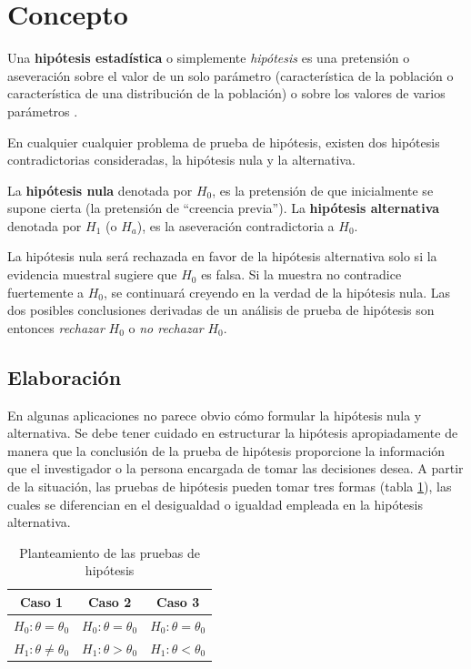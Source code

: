 \documentclass[
  11pt,
]{book}
\theoremstyle{definition}
\theoremstyle{definition}
\theoremstyle{definition}
\theoremstyle{definition}
\theoremstyle{remark}
\begin{document}
\section{Concepto}\label{concepto-1}

Una \textbf{hipótesis estadística} o simplemente \emph{hipótesis} es una pretensión o aseveración sobre el valor de un solo parámetro (característica de la población o característica de una distribución de la población) o sobre los valores de varios parámetros \citep[página 285]{Devore} \citep[página 340]{anderson}.

En cualquier cualquier problema de prueba de hipótesis, existen dos hipótesis contradictorias consideradas, la hipótesis nula y la alternativa.

La \textbf{hipótesis nula} denotada por \(H_0\), es la pretensión de que inicialmente se supone cierta (la pretensión de ``creencia previa''). La \textbf{hipótesis alternativa} denotada por \(H_1\) (o \(H_a\)), es la aseveración contradictoria a \(H_0\).

La hipótesis nula será rechazada en favor de la hipótesis alternativa solo si la evidencia muestral sugiere que \(H_0\) es falsa. Si la muestra no contradice fuertemente a \(H_0\), se continuará creyendo en la verdad de la hipótesis nula. Las dos posibles conclusiones derivadas de un análisis de prueba de hipótesis son entonces \emph{rechazar} \(H_0\) o \emph{no rechazar} \(H_0\).

\subsection{Elaboración}\label{elaboraciuxf3n-1}

En algunas aplicaciones no parece obvio cómo formular la hipótesis nula y alternativa. Se debe tener cuidado en estructurar la hipótesis apropiadamente de manera que la conclusión de la prueba de hipótesis proporcione la información que el investigador o la persona encargada de tomar las decisiones desea. A partir de la situación, las pruebas de hipótesis pueden tomar tres formas (tabla \ref{tab:hipotesis}), las cuales se diferencian en el desigualdad o igualdad empleada en la hipótesis alternativa.

\begin{table}[H]
\centering
\caption{\label{tab:hipotesis}Planteamiento de las pruebas de hipótesis}
\centering
\begin{tabular}[t]{ccc}
\toprule
Caso 1 & Caso 2 & Caso 3\\
\midrule
$H_0: \theta = \theta_0$ & $H_0: \theta = \theta_0$ & $H_0: \theta = \theta_0$\\
$H_1: \theta \neq \theta_0$ & $H_1: \theta > \theta_0$ & $H_1:\theta < \theta_0$\\
\bottomrule
\end{tabular}
\end{table}
\end{document}
